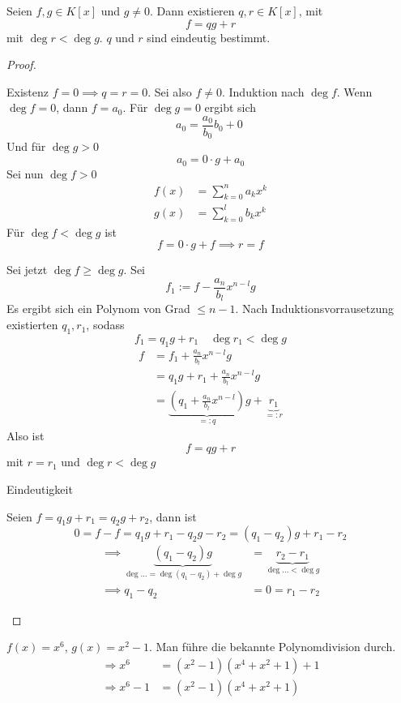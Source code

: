 \documentclass{mycourse}
\begin{document}
\begin{thm}
\label{thm:10.14}
Seien $f,g\in K[x]$ und $g\neq 0$.
Dann existieren $q,r\in K[x]$, mit
\[
f=qg+r
\]
mit $\deg r < \deg g$.
$q$ und $r$ sind eindeutig bestimmt.

\begin{proof}
	\begin{seg}{Existenz}
		$f=0 \implies q=r=0$.
Sei also $f\neq 0$.
Induktion nach $\deg f$.
Wenn $\deg f = 0$, dann $f=a_0$.
Für $\deg g=0$ ergibt sich
\[
a_0=\frac {a_0}{b_0}b_0 + 0\
\]
Und für $\deg g > 0$
\[
a_0=0\cdot g + a_0
\]
Sei nun $\deg f>0$
\begin{align*}
f(x)&=\sum_{k=0}^na_kx^k\\
g(x)&=\sum_{k=0}^lb_kx^k
\end{align*}
Für $\deg f < \deg g$ ist
\[
f=0\cdot g + f \implies r=f
\]

Sei jetzt $\deg f\ge \deg g$.
Sei
\[
f_1:=f-\frac{a_n}{b_l}x^{n-l}g
\]
Es ergibt sich ein Polynom von Grad $\le n-1$.
Nach Induktionsvorrausetzung existierten $q_1,r_1$, sodass
\[
f_1=q_1g+r_1 \quad \deg r_1<\deg g
\]
\begin{align*}
f&=f_1+\frac {a_n}{b_l}x^{n-l}g\\
&=q_1g+r_1+\frac {a_n}{b_l}x^{n-l}g\\
&=\underbrace{\left(q_1+\frac{a_n}{b_l}x^{n-l}\right)}_{=:q}g+\underbrace{r_1}_{=:r}
\end{align*}
Also ist
\[
f=qg+r
\]
mit $r=r_1$ und $\deg r<\deg g$
\end{seg}
\begin{seg}{Eindeutigkeit}

Seien $f=q_1g+r_1=q_2g+r_2$, dann ist
\[
0=f-f=q_1g+r_1-q_2g-r_2=(q_1-q_2)g+r_1-r_2
\]
\begin{align*}
\implies \underbrace{(q_1-q_2)g}_{\deg{\dotsc}=\deg(q_1-q_2)+\deg g} &=\underbrace{r_2-r_1}_{\deg{\dotsc}<\deg g}\\
\implies q_1-q_2&=0=r_1-r_2
\end{align*}
\end{seg}
\end{proof}
\end{thm}

\begin{ex}
$f(x)=x^6$, $g(x)=x^2-1$.
Man führe die bekannte Polynomdivision durch.
\begin{align*}
\Rightarrow x^6&=(x^2-1)(x^4+x^2+1)+1 \\
\Rightarrow x^6-1 &= (x^2-1)(x^4+x^2+1)
\end{align*}
\end{ex}
\end{document}

